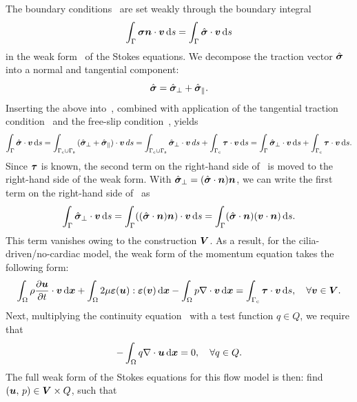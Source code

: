 \documentclass{WileyMSP-template}
\begin{document}
The boundary conditions~ are set weakly through the
boundary integral 
\begin{equation}
    \int_{\Gamma}\bm{\sigma}\bm{n}\cdot\bm{v} \, \mathrm ds =  \int_{\Gamma}\hat{\bm{\sigma}}\cdot\bm{v} \, \mathrm ds
    \label{eq:boundary_integral_BC1}
\end{equation}
in the weak form~ of the Stokes equations.
We decompose the traction vector $\hat{\bm{\sigma}}$ into a normal and tangential component:
\begin{equation*}
    \hat{\bm{\sigma}} = \hat{\bm{\sigma}}_{\perp} + \hat{\bm{\sigma}}_{\parallel}.
\end{equation*}
Inserting the above into~,
combined with application of the tangential traction
condition~ and the
free-slip condition~, yields
\begin{equation}
    \int_{\Gamma}\hat{\bm{\sigma}}\cdot\bm{v} \, \mathrm ds = \int_{\Gamma_{\mathrm{c}}\cup\Gamma_{\mathrm{s}}}{(\hat{\bm{\sigma}}_{\perp} + \hat{\bm{\sigma}}_{\parallel})\cdot\bm{v}}\, ds = 
    \int_{\Gamma_{\mathrm{c}}\cup\Gamma_{\mathrm{s}}}{\hat{\bm{\sigma}}_{\perp}\cdot\bm{v}}\, ds
    + \int_{\Gamma_{\mathrm{c}}}\bm{\tau}\cdot\bm{v} \, \mathrm ds = \int_{\Gamma}\hat{\bm{\sigma}}_{\perp}\cdot\bm{v} \, \mathrm ds + \int_{\Gamma_{\mathrm{c}}}\bm{\tau}\cdot\bm{v} \, \mathrm ds.
    \label{eq:boundary_integral_BC2}
\end{equation}
Since $\bm{\tau}$ is known, the second term on the right-hand side of~
is moved to the right-hand side of the weak form.
With $\hat{\bm{\sigma}}_{\perp} = (\hat{\bm{\sigma}}\cdot\bm{n})\bm{n}$,
we can write the first term on the right-hand side of~ as
\begin{equation}
    \int_{\Gamma}\hat{\bm{\sigma}}_{\perp}\cdot\bm{v} \, \mathrm ds = \int_{\Gamma}((\hat{\bm{\sigma}}\cdot\bm{n})\bm{n})\cdot\bm{v} \, \mathrm ds =
    \int_{\Gamma}(\hat{\bm{\sigma}}\cdot\bm{n})(\bm{v}\cdot\bm{n}) \, \mathrm ds.
    \label{eq:boundary_integral_BC_normal}
\end{equation}
This term vanishes owing to the construction $\bm{V}$.
As a result, for the cilia-driven/no-cardiac model,
the weak form of the momentum equation takes the following form:
\begin{equation*}
    \int_{\Omega}\rho\frac{\partial \bm{u}}{\partial t}\cdot\bm{v} \, \mathrm d\bm{x}
    + \int_{\Omega}2\mu\bm{\varepsilon}(\bm{u}) : \bm{\varepsilon}(\bm{v}) \, \mathrm d\bm{x}
    - \int_{\Omega}p\nabla\cdot\bm{v} \, \mathrm d\bm{x} = \int_{\Gamma_{\mathrm{c}}}\bm{\tau}\cdot\bm{v} \, \mathrm ds, \quad\forall\bm{v}\in\bm{V}.
\end{equation*}
Next, multiplying the continuity equation~
with a test function $q\in Q$, we require that
\begin{equation}
    -\int_{\Omega}q\nabla\cdot\bm{u} \, \mathrm d\bm{x} = 0,\quad\forall q\in Q.
    \label{eq:pressure_weak_form}
\end{equation}
The full weak form of the Stokes equations for this flow model is then:
find $(\bm{u}, \, p) \in \bm{V}\times Q$, such that
\end{document}
